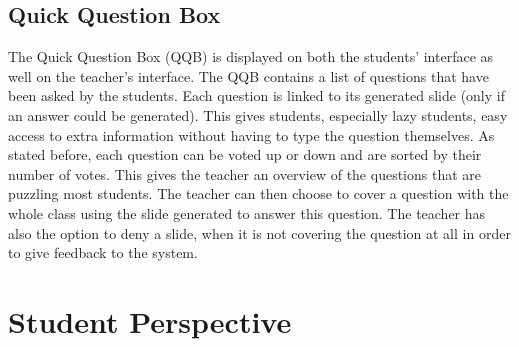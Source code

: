 \documentclass[11pt]{article}
\begin{document}
\subsection{Quick Question Box}
\label{qqb}
The Quick Question Box (QQB) is displayed on both the students' interface as well on the teacher's interface. The QQB contains a list of questions that have been asked by the students. Each question is linked to its generated slide (only if an answer could be generated). This gives students, especially lazy students, easy access to extra information without having to type the question themselves. As stated before, each question can be voted up or down and are sorted by their number of votes. This gives the teacher an overview of the questions that are puzzling most students. The teacher can then choose to cover a question with the whole class using the slide generated to answer this question. The teacher has also the option to deny a slide, when it is not covering the question at all in order to give feedback to the system.


\section{Student Perspective}
\end{document}
